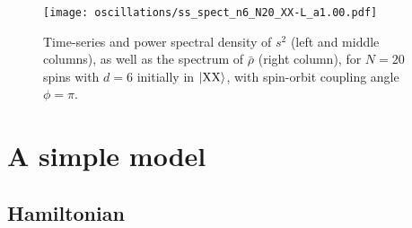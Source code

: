 \documentclass[nofootinbib,notitlepage,11pt]{revtex4-2}
\newcommand{\1}{\mathds{1}}
\newcommand{\X}{\text{X}}
\begin{document}
\begin{figure}
  \centering
  \texttt{[image: oscillations/ss\_spect\_n6\_N20\_XX-L\_a1.00.pdf]}
  \caption{Time-series and power spectral density of $s^2$ (left and middle columns), as well as the spectrum of $\bar\rho$ (right column), for $N=20$ spins with $d=6$ initially in $\ket{\X\X}$, with spin-orbit coupling angle $\phi=\pi$.}
  \label{fig:ss_spect_n6_XX-L_a1.0}
\end{figure}

\section{A simple model}

\subsection{Hamiltonian}
\end{document}

